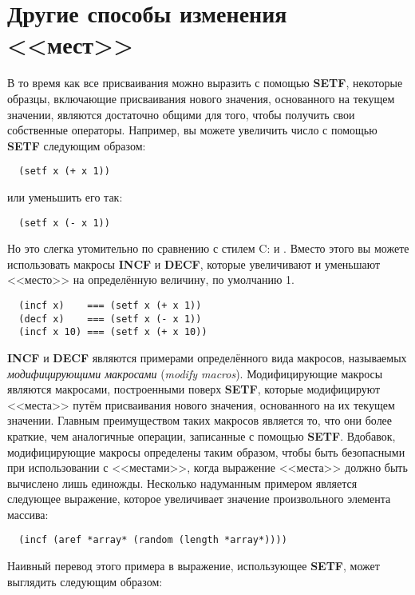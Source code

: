\section{Другие способы изменения <<мест>>}

В то время как все присваивания можно выразить с помощью \textbf{SETF}, некоторые образцы,
включающие присваивания нового значения, основанного на текущем значении, являются
достаточно общими для того, чтобы получить свои собственные операторы. Например, вы можете
увеличить число с помощью \textbf{SETF} следующим образом:

\begin{lstlisting}
  (setf x (+ x 1))
\end{lstlisting}

\noindent{}или уменьшить его так:

\begin{lstlisting}
  (setf x (- x 1))
\end{lstlisting}

Но это слегка утомительно по сравнению с стилем C:  и . Вместо этого
вы можете использовать макросы \textbf{INCF} и \textbf{DECF}, которые увеличивают и
уменьшают <<место>> на определённую величину, по умолчанию 1.

\begin{lstlisting}
  (incf x)    === (setf x (+ x 1))
  (decf x)    === (setf x (- x 1))
  (incf x 10) === (setf x (+ x 10))
\end{lstlisting}

\textbf{INCF} и \textbf{DECF} являются примерами определённого вида макросов, называемых
\textit{модифицирующими макросами} (\textit{modify macros}). Модифицирующие макросы
являются макросами, построенными поверх \textbf{SETF}, которые модифицируют <<места>> путём
присваивания нового значения, основанного на их текущем значении. Главным преимуществом
таких макросов является то, что они более краткие, чем аналогичные операции, записанные с
помощью \textbf{SETF}. Вдобавок, модифицирующие макросы определены таким образом, чтобы
быть безопасными при использовании с <<местами>>, когда выражение <<места>> должно быть
вычислено лишь единожды. Несколько надуманным примером является следующее выражение,
которое увеличивает значение произвольного элемента массива:

\begin{lstlisting}
  (incf (aref *array* (random (length *array*))))
\end{lstlisting}

Наивный перевод этого примера в выражение, использующее \textbf{SETF}, может выглядить
следующим образом:

